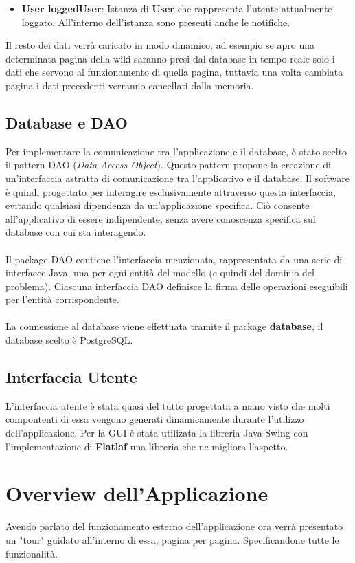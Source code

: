 \documentclass{article}
\begin{document}
	\begin{itemize}
		\item \textbf{User loggedUser}: Istanza di \textbf{User} che rappresenta l'utente attualmente loggato. All'interno dell'istanza sono presenti anche le notifiche.
	\end{itemize}
	
	Il resto dei dati verr\`a caricato in modo dinamico, ad esempio se apro una determinata pagina della wiki saranno presi dal database in tempo reale solo i dati che servono al funzionamento di quella pagina, tuttavia una volta cambiata pagina i dati precedenti verranno cancellati dalla memoria.


	\subsection{Database e DAO}
	Per implementare la comunicazione tra l'applicazione e il database, è stato scelto il pattern DAO (\textit{Data Access Object}). Questo pattern propone la creazione di un'interfaccia astratta di comunicazione tra l'applicativo e il database. Il software è quindi progettato per interagire esclusivamente attraverso questa interfaccia, evitando qualsiasi dipendenza da un'applicazione specifica. Ciò consente all'applicativo di essere indipendente, senza avere conoscenza specifica sul database con cui sta interagendo.
	\\\\
	Il package DAO contiene l'interfaccia menzionata, rappresentata da una serie di interfacce Java, una per ogni entità del modello (e quindi del dominio del problema). Ciascuna interfaccia DAO definisce la firma delle operazioni eseguibili per l'entità corrispondente.
	\\\\
	La connessione al database viene effettuata tramite il package \textbf{database}, il database scelto \`e PostgreSQL.
	
	\subsection{Interfaccia Utente}
	L'interfaccia utente \`e stata quasi del tutto progettata a mano visto che molti compontenti di essa vengono generati dinamicamente durante l'utilizzo dell'applicazione. Per la GUI \`e stata utilizata la libreria Java Swing con l'implementazione di \textbf{Flatlaf} una libreria che ne migliora l'aspetto.

	
	\section{Overview dell'Applicazione}
	Avendo parlato del funzionamento esterno dell'applicazione ora verr\`a presentato un "tour" guidato all'interno di essa, pagina per pagina. Specificandone tutte le funzionalit\`a.
	
\end{document}
